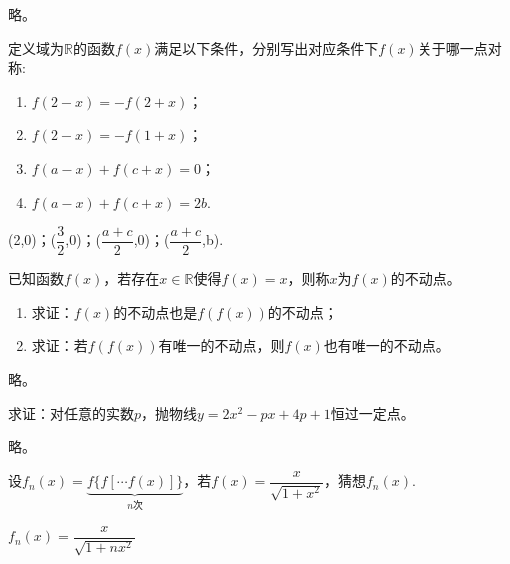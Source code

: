 \documentclass[lang=cn,newtx,10pt,scheme=chinese]{elegantbook}
\begin{document}
\begin{solution}
  略。
\end{solution}

\begin{exercise}
  定义域为$\mathbb{R}$的函数$f(x)$满足以下条件，分别写出对应条件下$f(x)$关于哪一点对称:
\end{exercise}

\begin{enumerate}
  \item $f(2-x)=-f(2+x)$；
  \item $f(2-x)=-f(1+x)$；
  \item $f(a-x)+f(c+x)=0$；
  \item $f(a-x)+f(c+x)=2b$.
\end{enumerate}

\begin{spacing}{1.8}
  \begin{solution}
    (2,0)；($\dfrac32$,0)；($\dfrac{a+c}{2}$,0)；($\dfrac{a+c}{2}$,b).
  \end{solution}
\end{spacing}



\begin{exercise}
  已知函数$f(x)$，若存在$x\in\mathbb{R}$使得$f(x)=x$，则称$x$为$f(x)$的不动点。
\end{exercise}

\begin{enumerate}
  \item 求证：$f(x)$的不动点也是$f(f(x))$的不动点；
  \item 求证：若$f(f(x))$有唯一的不动点，则$f(x)$也有唯一的不动点。
\end{enumerate}

\begin{solution}
  略。
\end{solution}

\begin{exercise}\label{ASJC_G1_P22.5}
  求证：对任意的实数$p$，抛物线$y=2x^2-px+4p+1$恒过一定点。
\end{exercise}

\begin{solution}
  略。
\end{solution}

\begin{exercise}
  设$f_n(x)=\underbrace{f\{f[\cdots f(x)]\}}_{n\text{次}}$，若$f(x)=\dfrac{x}{\sqrt{1+x^2}}$，猜想$f_n(x)$.
\end{exercise}

\begin{solution}
  $f_{n}(x)=\dfrac{x}{\sqrt{1+nx^{2}}}$
\end{solution}
\end{document}
